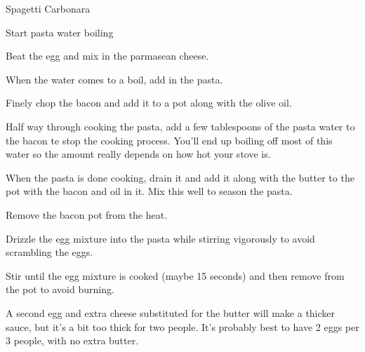 \documentclass{recipe}
\begin{document}
\begin{recipe}{Spagetti Carbonara}

  \begin{ingredients}
  \end{ingredients}

  \begin{steps}
  \item Start pasta water boiling
  \item Beat the egg and mix in the parmasean cheese.
  \item When the water comes to a boil, add in the pasta.
  \item Finely chop the bacon and add it to a pot along with the olive
    oil.
  \item Half way through cooking the pasta, add a few tablespoons of
    the pasta water to the bacon te stop the cooking process.  You'll
    end up boiling off most of this water so the amount really depends
    on how hot your stove is.
  \item When the pasta is done cooking, drain it and add it along with
    the butter to the pot with the bacon and oil in it.  Mix this well
    to season the pasta.
  \item Remove the bacon pot from the heat.
  \item Drizzle the egg mixture into the pasta while stirring
    vigorously to avoid scrambling the eggs.
  \item Stir until the egg mixture is cooked (maybe 15 seconds) and
    then remove from the pot to avoid burning.
  \end{steps}

  \begin{notes}
  \item A second egg and extra cheese substituted for the butter will
    make a thicker sauce, but it's a bit too thick for two people.
    It's probably best to have 2 eggs per 3 people, with no extra
    butter.
  \end{notes}
\end{recipe}
\end{document}
